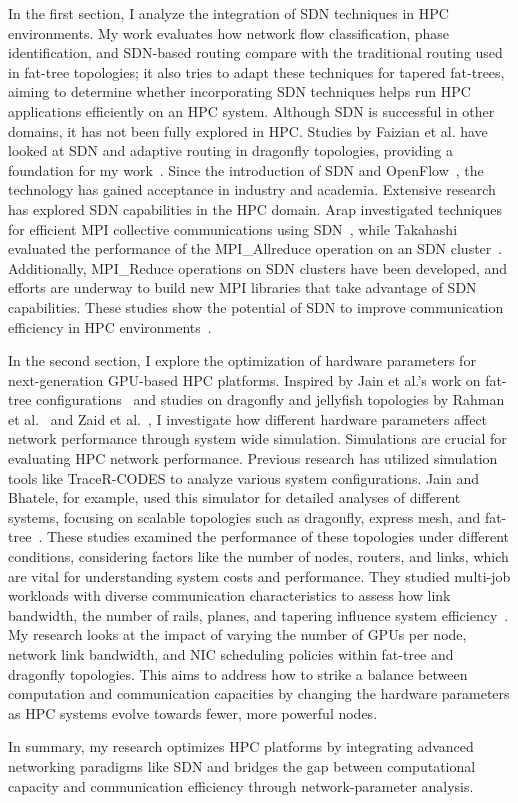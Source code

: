 In the first section, I analyze the integration of SDN techniques in HPC environments.
My work evaluates how network flow classification, phase identification, and SDN-based routing compare with the traditional routing used in fat-tree topologies; it also tries to adapt these techniques for tapered fat-trees, aiming to determine whether incorporating SDN techniques helps run HPC applications efficiently on an HPC system.
Although SDN is successful in other domains, it has not been fully explored in HPC. 
Studies by Faizian et al. have looked at SDN and adaptive routing in 
dragonfly topologies, providing a foundation for my work~\cite{faizian2017comparative}.
Since the introduction of SDN and OpenFlow~\cite{openflow}, the technology has gained acceptance in 
industry and academia. Extensive research has explored SDN capabilities in the HPC domain. 
Arap investigated techniques for efficient MPI collective communications using SDN~\cite{arap2014software}, 
while Takahashi evaluated the performance of the MPI\_Allreduce operation on an SDN cluster~\cite{takahashi2014performance}. 
Additionally, MPI\_Reduce operations on SDN clusters have been developed, 
and efforts are underway to build new MPI libraries that 
take advantage of SDN capabilities. These studies show the potential of SDN to 
improve communication efficiency in HPC environments~\cite{munkhdorj2015design, takahashi2015concept}.

In the second section, I explore the optimization of hardware parameters 
for next-generation GPU-based HPC platforms. Inspired by Jain et al.'s work on fat-tree configurations~\cite{jain2017predicting} 
and studies on dragonfly and jellyfish topologies by Rahman et al.~\cite{rahman2019topology} and Zaid et al.~\cite{alzaid2021multi}, I investigate how different hardware parameters affect network performance through system wide simulation.
Simulations are crucial for evaluating HPC network performance. 
Previous research has utilized simulation tools like TraceR-CODES to analyze various system configurations. 
Jain and Bhatele, for example, used this simulator for detailed analyses 
of different systems, focusing on scalable topologies such as dragonfly, express mesh, and fat-tree~\cite{bhatele2019analyzing}. 
These studies examined the performance of these topologies under different conditions, 
considering factors like the number of nodes, routers, and links, 
which are vital for understanding system costs and performance.
They studied multi-job workloads with diverse communication characteristics 
to assess how link bandwidth, the number of rails, planes, and tapering 
influence system efficiency~\cite{jain2017predicting}. 
My research looks at the impact of varying the number of GPUs per node, 
network link bandwidth, and NIC scheduling policies within 
fat-tree and dragonfly topologies. 
This aims to address how to strike a balance between computation 
and communication capacities by changing the hardware parameters
as HPC systems evolve towards fewer, more powerful nodes.

In summary, my research optimizes HPC platforms by integrating advanced networking paradigms like SDN and bridges the gap between computational capacity and communication efficiency through network-parameter analysis.
